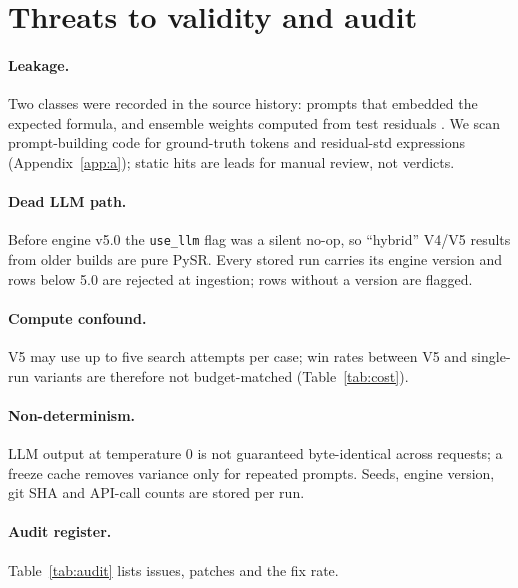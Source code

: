 \section{Threats to validity and audit}\label{sec:threats}
\paragraph{Leakage.} Two classes were recorded in the source history: prompts that embedded the expected formula, and ensemble weights computed from test residuals \citep{zhang2017rethinking}. We scan prompt-building code for ground-truth tokens and residual-std expressions (Appendix~\ref{app:a}); static hits are leads for manual review, not verdicts.
\paragraph{Dead LLM path.} Before engine v5.0 the \texttt{use\_llm} flag was a silent no-op, so ``hybrid'' V4/V5 results from older builds are pure PySR. Every stored run carries its engine version and rows below 5.0 are rejected at ingestion; rows without a version are flagged.
\paragraph{Compute confound.} V5 may use up to five search attempts per case; win rates between V5 and single-run variants are therefore not budget-matched (Table~\ref{tab:cost}).
\paragraph{Non-determinism.} LLM output at temperature 0 is not guaranteed byte-identical across requests; a freeze cache removes variance only for repeated prompts. Seeds, engine version, git SHA and API-call counts are stored per run.
\paragraph{Audit register.} Table~\ref{tab:audit} lists issues, patches and the fix rate.
\begin{table}[t]\centering\scriptsize{}\caption{Audit register.}\label{tab:audit}\end{table}
